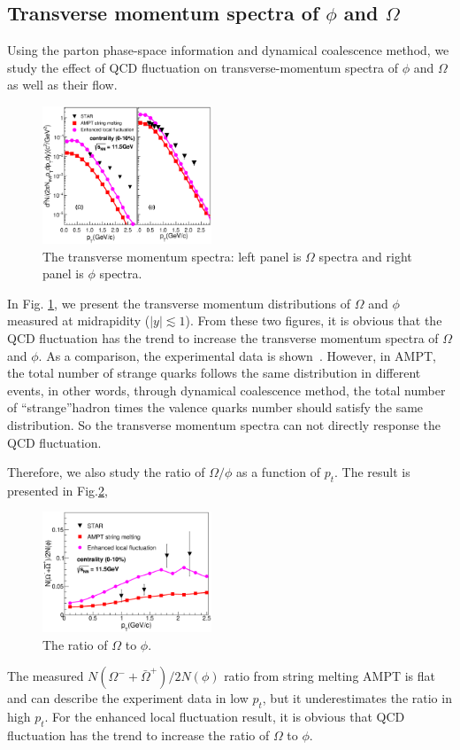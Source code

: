 \documentclass[twocolumn,aps,prc,showpacs,superscriptaddress,preprintnumbers,floatfix,nofootinbib]{revtex4}
\begin{document}
\begin{CJK*}{GBK}{song}
  \section{Transverse momentum spectra of $\phi$ and $\Omega$}
  Using the parton phase-space information and dynamical coalescence method, we study
  the effect of QCD fluctuation on transverse-momentum spectra of $\phi$ and $\Omega$
  as well as their flow.
  \begin{figure}[htbp]
    \centering
    \includegraphics[width=0.45\textwidth]{./figure/yield.eps}
    \caption{The transverse momentum spectra: left panel is $\Omega$ spectra and right
      panel is $\phi$ spectra.}
    \label{fig:omegaspectra}
  \end{figure}
  In Fig. \ref{fig:omegaspectra}, we present the transverse momentum distributions
  of $\Omega$ and $\phi$ measured at midrapidity ($|y| \lesssim 1$). From these two
  figures, it is obvious that the QCD fluctuation has the trend to increase the transverse
  momentum spectra of $\Omega$ and $\phi$. As a comparison, the experimental data is
  shown~\cite{STAR}. However, in AMPT, the total number of
  strange quarks follows the same distribution in different events, in other words,
  through dynamical coalescence method, the total number of
  \textquotedblleft{strange}\textquotedblright hadron times the valence quarks number
  should satisfy the same distribution. So the transverse momentum spectra can not directly
  response the QCD fluctuation.
  \par
  Therefore, we also study the ratio of $\Omega/\phi$ as a function of $p_t$. The result
  is presented in Fig.\ref{fig:ratio},
  \begin{figure}[htpb]
    \centering
    \includegraphics[width=0.45\textwidth]{./figure/ratio.eps}
    \caption{The ratio of $\Omega$ to $\phi$.}
    \label{fig:ratio}
  \end{figure}
  The measured $N(\Omega^{-}+\bar{\Omega}^{+})/2N(\phi)$ ratio from string melting
  AMPT is flat and can describe the experiment data in low $p_t$, but it underestimates
  the ratio in high $p_{t}$. For the enhanced local fluctuation result, it is obvious that
  QCD fluctuation has the trend to increase the ratio of $\Omega$ to $\phi$.


\end{CJK*}
\end{document}
